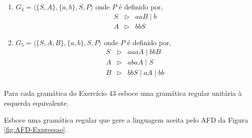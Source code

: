 \begin{problemset}
\begin{enumerate}
		\item $G_4 = \langle \{S, A\},\{a, b\}, S, P \rangle$ onde $P$ é definido por,
		\begin{eqnarray*}
			S & \rhd & aaB \mid b\\
			A & \rhd & bbS 
		\end{eqnarray*}
		
		\item $G_5 = \langle \{S, A, B\},\{a, b\}, S, P \rangle$ onde $P$ é definido por, 
		\begin{eqnarray*}
			S & \rhd & aaaA \mid bbB\\
			A & \rhd & abaA \mid S\\
			B & \rhd & bbS \mid aA \mid bb\\ 
		\end{eqnarray*}
	\end{enumerate}

	\item Para cada gramática do Exercício 43 esboce uma gramática regular unitária à esquerda equivalente.
	
	\item Esboce uma gramática regular que gere a linguagem aceita pelo AFD da Figura \ref{fig:AFD-Expressao}. 
	
\end{problemset}